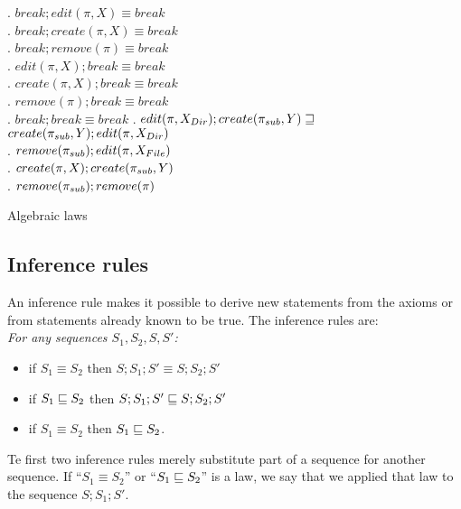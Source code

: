 \begin{table}[H]
\begin{table}[thb]
{{{\begin{minipage}{7.2cm}
\lawxxix. \(break; edit(\pi,X) \equiv break\)\\
\lawxxx. \(break; create(\pi,X) \equiv break\)\\
\lawxxxi. \(break; remove(\pi) \equiv break\)\\
\lawxxxii. \(edit(\pi,X); break \equiv break\)\\
\lawxxxiii. \(create(\pi,X); break \equiv break\)\\
\lawxxxiv. \(remove(\pi); break \equiv break\)\\
\lawxxxv. \(break; break \equiv break\)
\lawiibp. \(edit(\pi,X_{Dir}); create(\pi_{sub},Y)\sqsupseteq\)\\\indent\(%
create(\pisub,Y); edit(\pi,\cdir{X})\)\\
\lawiiic. \(remove(\pi_{sub}); edit(\pi,X_{File})\)\\
\lawxxxvi. \(create(\pi,X); create(\pi_{sub},Y)\)\\
\lawxxxvii. \(remove(\pi_{sub}); remove(\pi)\)
\end{minipage}
}}
}
\caption{Algebraic laws}
\end{table}

\subsection{Inference rules}

An inference rule makes it possible to derive new statements from 
the axioms or from statements already known to be true. 
The inference rules are:\\
\emph{For any sequences \(S_1, S_2, S, S'\):}
\begin{itemize}
\item if \(S_1\equiv S_2\) then \(S;S_1;S'\equiv S;S_2;S'\)
\item if \(S_1\sqsubseteq S_2\) then \(S;S_1;S'\sqsubseteq S;S_2;S'\)
\item if \(S_1\equiv S_2\) then \(S_1\sqsubseteq S_2\).
\end{itemize}
Te first two inference rules merely substitute part of a sequence for
another sequence.
If ``\(S_1\equiv S_2\)'' or 
``\(S_1\sqsubseteq S_2\)'' is a law, we say that we applied that law to
the sequence \(S;S_1;S'\).


\end{table}
